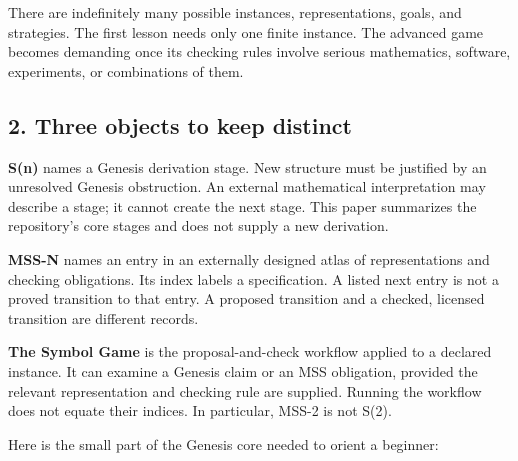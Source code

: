 \documentclass[
  11pt,
]{article}
\begin{document}
There are indefinitely many possible instances, representations, goals,
and strategies. The first lesson needs only one finite instance. The
advanced game becomes demanding once its checking rules involve serious
mathematics, software, experiments, or combinations of them.

\subsection{2. Three objects to keep
distinct}\label{three-objects-to-keep-distinct}

\textbf{S(n)} names a Genesis derivation stage. New structure must be
justified by an unresolved Genesis obstruction. An external mathematical
interpretation may describe a stage; it cannot create the next stage.
This paper summarizes the repository's core stages and does not supply a
new derivation.

\textbf{MSS-N} names an entry in an externally designed atlas of
representations and checking obligations. Its index labels a
specification. A listed next entry is not a proved transition to that
entry. A proposed transition and a checked, licensed transition are
different records.

\textbf{The Symbol Game} is the proposal-and-check workflow applied to a
declared instance. It can examine a Genesis claim or an MSS obligation,
provided the relevant representation and checking rule are supplied.
Running the workflow does not equate their indices. In particular, MSS-2
is not S(2).

Here is the small part of the Genesis core needed to orient a beginner:
\end{document}
